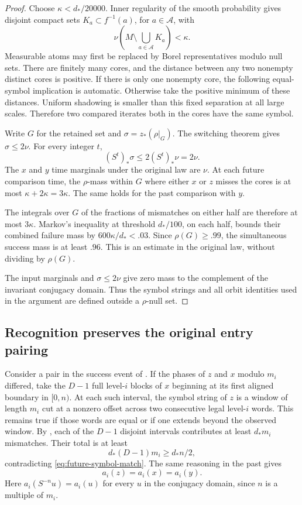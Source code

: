 \begin{proof}
Choose $\kappa<d_*/20000$. Inner regularity of the smooth
probability gives disjoint compact sets
$K_a\subset f^{-1}(a)$, for $a\in\mathcal A$, with
\[
 \nu\left(M\setminus\bigcup_{a\in\mathcal A}K_a\right)<\kappa.
\]
Measurable atoms may first be replaced by Borel representatives
modulo null sets. There are finitely many cores, and the distance
between any two nonempty distinct cores is positive. If there is
only one nonempty core, the following equal-symbol implication is
automatic. Otherwise take the positive minimum of these distances.
Uniform shadowing is smaller than this fixed separation at all
large scales. Therefore two compared iterates both in the cores
have the same symbol.

Write $G$ for the retained set and
$\sigma=z_*(\rho|_G)$. The switching theorem gives
$\sigma\le2\nu$. For every integer $t$,
\[
 (S^t)_*\sigma\le2(S^t)_*\nu=2\nu.
\]
The $x$ and $y$ time marginals under the original law are $\nu$.
At each future comparison time, the $\rho$-mass within $G$
where either $x$ or $z$ misses the cores is at most
$\kappa+2\kappa=3\kappa$. The same holds for the past comparison
with $y$.

The integrals over $G$ of the fractions of mismatches on either
half are therefore at most $3\kappa$. Markov's inequality at
threshold $d_*/100$, on each half, bounds their combined failure
mass by $600\kappa/d_*<.03$. Since $\rho(G)\ge .99$,
the simultaneous success mass is at least $.96$.
This is an estimate in the original law, without dividing
by $\rho(G)$.

The input marginals and $\sigma\le2\nu$ give zero mass to
the complement of the invariant conjugacy domain. Thus the
symbol strings and all orbit identities used in the argument
are defined outside a $\rho$-null set.
\end{proof}

\subsection{Recognition preserves the original entry pairing}

Consider a pair in the success event of .
If the phases of $z$ and $x$ modulo $m_i$ differed, take the
$D-1$ full level-$i$ blocks of $x$ beginning at its first
aligned boundary in $[0,n)$. At each such interval, the symbol
string of $z$ is a window of length $m_i$ cut at a nonzero
offset across two consecutive legal level-$i$ words. This
remains true if those words are equal or if one extends beyond
the observed window. By , each of the
$D-1$ disjoint intervals contributes at least $d_*m_i$
mismatches. Their total is at least
\[
 d_*(D-1)m_i\ge d_*n/2,
\]
contradicting \eqref{eq:future-symbol-match}.
The same reasoning in the past gives
\begin{equation}\label{eq:phase-recovery}
 a_i(z)=a_i(x)=a_i(y).
\end{equation}
Here $a_i(S^{-n}u)=a_i(u)$ for every $u$ in the conjugacy
domain, since $n$ is a multiple of $m_i$.


